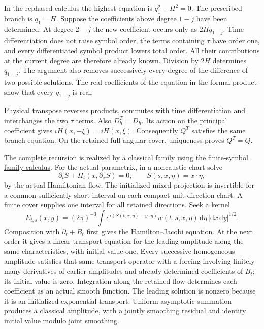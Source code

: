 \documentclass[
  english,
  11pt,
  reqno]{amsart}
\begin{document}
In the rephased calculus the highest equation is \(q_1^2-H^2=0\). The
prescribed branch is \(q_1=H\). Suppose the coefficients above degree
\(1-j\) have been determined. At degree \(2-j\) the new coefficient
occurs only as \(2Hq_{1-j}\). Time differentiation does not raise symbol
order, the terms containing \(\tau\) have order one, and every
differentiated symbol product lowers total order. All their
contributions at the current degree are therefore already known.
Division by \(2H\) determines \(q_{1-j}\). The argument also removes
successively every degree of the difference of two possible solutions.
The real coefficients of the equation in the formal product show that
every \(q_{1-j}\) is real.

Physical transpose reverses products, commutes with time differentiation
and interchanges the two \(\tau\) terms. Also \(D_h^T=D_h\). Its action
on the principal coefficient gives \(iH(x,-\xi)=iH(x,\xi)\).
Consequently \(Q^T\) satisfies the same branch equation. On the retained
full angular cover, uniqueness proves \(Q^T=Q\).

The complete recursion is realized by a classical family using
\hyperref[lem:online-finite-symbol-family-calculus]{the finite-symbol
family calculus}. For the actual parametrix, in a noncaustic chart solve%
 \[
\partial_tS+H_t(x,\partial_xS)=0,
\qquad S(s,x,\eta)=x\cdot\eta,
\] by the actual Hamiltonian flow. The initialized mixed projection is
invertible for a common sufficiently short interval on each compact
unit-direction chart. A finite cover supplies one interval for all
retained directions. Seek a kernel%
 \[
E_{t,s}(x,y)
=(2\pi)^{-3}\int
e^{i(S(t,x,\eta)-y\cdot\eta)}
w(t,s,x,\eta)\,\mathrm d\eta\,
|\mathrm dx\,\mathrm dy|^{1/2}.
\] Composition with \(\partial_t+B_t\) first gives the Hamilton--Jacobi
equation. At the next order it gives a linear transport equation for the
leading amplitude along the same characteristics, with initial value
one. Every successive homogeneous amplitude satisfies that same
transport operator with a forcing involving finitely many derivatives of
earlier amplitudes and already determined coefficients of \(B_t\); its
initial value is zero. Integration along the retained flow determines
each coefficient as an actual smooth function. The leading solution is
nonzero because it is an initialized exponential transport. Uniform
asymptotic summation produces a classical amplitude, with a jointly
smoothing residual and identity initial value modulo joint smoothing.
\end{document}

